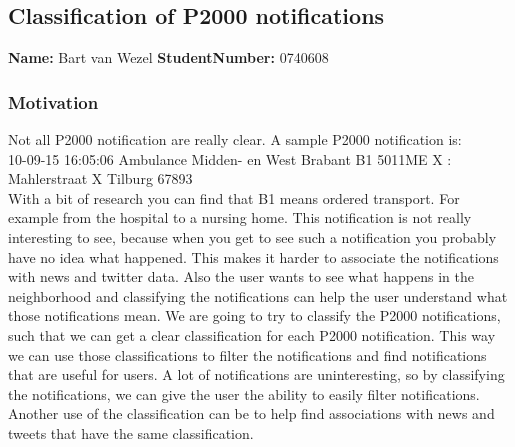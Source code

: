 \subsection{Classification of P2000 notifications }
\textbf{Name:} Bart van Wezel \indent \textbf{StudentNumber:} 0740608

\subsubsection*{Motivation}
Not all P2000 notification are really clear. A sample P2000 notification is: \\ 
10-09-15 16:05:06 Ambulance Midden- en West Brabant B1 5011ME X : Mahlerstraat X Tilburg 67893 \\
With a bit of research you can find that B1 means ordered transport. For example from the hospital to a nursing home. 
This notification is not really interesting to see, because when you get to see such a notification you probably have no idea what happened. 
This makes it harder to associate the notifications with news and twitter data. 
Also the user wants to see what happens in the neighborhood and classifying the notifications can help the user understand what those notifications mean.
We are going to try to classify the P2000 notifications, such that we can get a clear classification for each P2000 notification.
This way we can use those classifications to filter the notifications and find notifications that are useful for users. 
A lot of notifications are uninteresting, so by classifying the notifications, we can give the user the ability to easily filter notifications.
Another use of the classification can be to help find associations with news and tweets that have the same classification.

